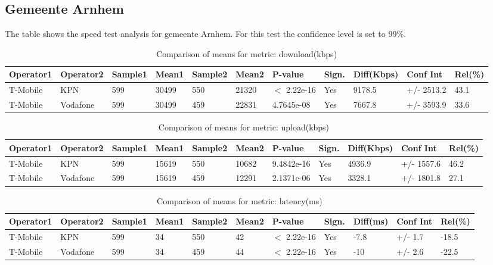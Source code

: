 \documentclass[]{article}
\begin{document}
\normalsize

\newpage

\subsection{Gemeente Arnhem}\label{gemeente-arnhem}

The table shows the speed test analysis for gemeente Arnhem. For this
test the confidence level is set to 99\%.

\begin{table}[ht]
\centering
{\footnotesize
\begin{tabular}{lllllllllll}
  \hline
Operator1 & Operator2 & Sample1 & Mean1 & Sample2 & Mean2 & P-value & Sign. & Diff(Kbps) & Conf Int & Rel(\%) \\ 
  \hline
T-Mobile & KPN & 599 & 30499 & 550 & 21320 & $<$ 2.22e-16 & Yes & 9178.5 & +/- 2513.2 & 43.1 \\ 
  T-Mobile & Vodafone & 599 & 30499 & 459 & 22831 & 4.7645e-08 & Yes & 7667.8 & +/- 3593.9 & 33.6 \\ 
   \hline
\end{tabular}
}
\caption{Comparison of means for metric: download(kbps)} 
\end{table}

\begin{table}[ht]
\centering
{\footnotesize
\begin{tabular}{lllllllllll}
  \hline
Operator1 & Operator2 & Sample1 & Mean1 & Sample2 & Mean2 & P-value & Sign. & Diff(Kbps) & Conf Int & Rel(\%) \\ 
  \hline
T-Mobile & KPN & 599 & 15619 & 550 & 10682 & 9.4842e-16 & Yes & 4936.9 & +/- 1557.6 & 46.2 \\ 
  T-Mobile & Vodafone & 599 & 15619 & 459 & 12291 & 2.1371e-06 & Yes & 3328.1 & +/- 1801.8 & 27.1 \\ 
   \hline
\end{tabular}
}
\caption{Comparison of means for metric: upload(kbps)} 
\end{table}

\begin{table}[ht]
\centering
{\footnotesize
\begin{tabular}{lllllllllll}
  \hline
Operator1 & Operator2 & Sample1 & Mean1 & Sample2 & Mean2 & P-value & Sign. & Diff(ms) & Conf Int & Rel(\%) \\ 
  \hline
T-Mobile & KPN & 599 & 34 & 550 & 42 & $<$ 2.22e-16 & Yes & -7.8 & +/- 1.7 & -18.5 \\ 
  T-Mobile & Vodafone & 599 & 34 & 459 & 44 & $<$ 2.22e-16 & Yes & -10 & +/- 2.6 & -22.5 \\ 
   \hline
\end{tabular}
}
\caption{Comparison of means for metric: latency(ms)} 
\end{table}
\end{document}
